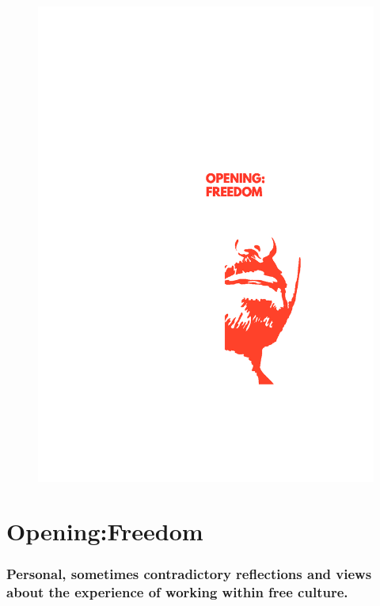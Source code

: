 \begin{figure}[htbp]
\centering
\includegraphics{../../images/cost-of-freedom-opening:freedom.jpg}
\caption{}
\end{figure}

\section{Opening:Freedom}\label{openingfreedom}

\subsubsection{Personal, sometimes contradictory reflections and views
about the experience of working within free
culture.}\label{personal-sometimes-contradictory-reflections-and-views-about-the-experience-of-working-within-free-culture.}

